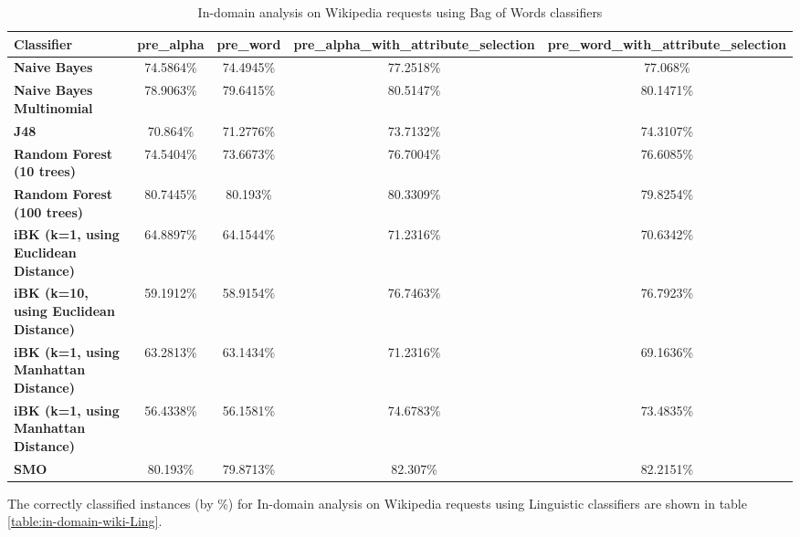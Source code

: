 \documentclass[conference]{IEEEtran}
\begin{document}
\begin{table*}[htbp]
\caption{In-domain analysis on Wikipedia requests using Bag of Words classifiers }
\centering
\vspace{5pt}
\begin{tabular}{|l|c|c|c|c|}
\hline
\textbf{Classifier} & \textbf{pre\_alpha} & \textbf{pre\_word} & \textbf{pre\_alpha\_with\_attribute\_selection} & \textbf{pre\_word\_with\_attribute\_selection} \\
\hline\hline
\textbf{Naive Bayes} & 74.5864\% & 74.4945\% & 77.2518\% & 77.068\% \\ 
\hline
\textbf{Naive Bayes Multinomial} & 78.9063\% & 79.6415\% & 80.5147\% & 80.1471\% \\ 
\hline
\textbf{J48} & 70.864\% & 71.2776\% & 73.7132\% & 74.3107\% \\ 
\hline
\textbf{Random Forest (10 trees)} & 74.5404\% & 73.6673\% & 76.7004\% & 76.6085\% \\ 
\hline
\textbf{Random Forest (100 trees)} & 80.7445\% & 80.193\% & 80.3309\% & 79.8254\% \\ 
\hline
\textbf{iBK (k=1, using Euclidean Distance)} & 64.8897\% & 64.1544\% & 71.2316\% & 70.6342\% \\ 
\hline
\textbf{iBK (k=10, using Euclidean Distance)} & 59.1912\% & 58.9154\% & 76.7463\% & 76.7923\% \\ 
\hline
\textbf{iBK (k=1, using Manhattan Distance)} & 63.2813\% & 63.1434\% & 71.2316\% & 69.1636\% \\ 
\hline
\textbf{iBK (k=1, using Manhattan Distance)} & 56.4338\% & 56.1581\% & 74.6783\% & 73.4835\% \\ 
\hline
\textbf{SMO} & 80.193\% & 79.8713\% & 82.307\% & 82.2151\% \\ 
\hline
\hline
\end{tabular}
\label{table:in-domain-wiki-BOW}
\end{table*}

The correctly classified instances (by \%) for In-domain analysis on Wikipedia requests using Linguistic classifiers are shown in table \ref{table:in-domain-wiki-Ling}.
\end{document}
